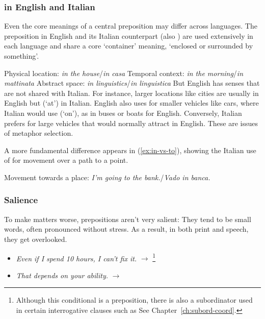 \subsubsection*{ in English and Italian}

Even the core meanings of a central preposition may differ across languages.
The preposition  in English and its Italian counterpart (also ) are used extensively in each language and share a core `container' meaning, `enclosed or
surrounded by something'.

\ea \label{ex:in-containment}
    \ea Physical location: \emph{in the house}/\emph{in casa}
    \ex Temporal context: \emph{in the morning}/\emph{in mattinata}
    \ex Abstract space: \emph{in linguistics}/\emph{in linguistica}
    \z
\z
But English  has senses that are not shared with Italian. For instance, larger locations like cities are usually  in English but  (`at') in Italian. English also uses  for smaller vehicles like cars, where Italian would use  (`on'), as in buses or boats for English. Conversely, Italian prefers  for large vehicles that would normally attract  in English. These are issues of metaphor selection.

A more fundamental difference appears in (\ref{ex:in-vs-to}), showing the Italian use of 
for movement over a path to a point.

\ea Movement towards a place: \emph{I'm going to the bank.}/\emph{Vado in banca.}\label{ex:in-vs-to}
\z
{}

\subsubsection*{Salience}
To make matters worse, prepositions aren't very salient: They tend to be small words, often pronounced without stress. As a result, in both print and speech, they get overlooked.

\begin{itemize}[noitemsep]
    \item   \textit{Even \emph{if} I spend 10 hours, I can't fix it.} $\rightarrow$ \footnote{Although this conditional   is a preposition, there is also a subordinator  used in certain interrogative clauses such as  See Chapter~\ref{ch:subord-coord}.}
    \item \textit{That depends \emph{on} your ability.} $\rightarrow$ 
\end{itemize}

